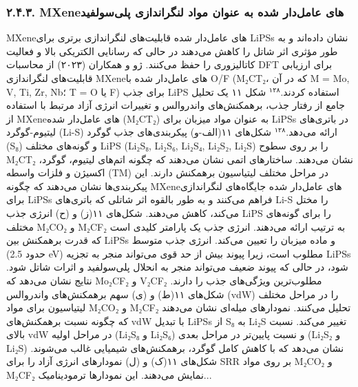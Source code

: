 \documentclass[12pt,a4paper,twocolumn]{article} %
\newcommand{\persian}[1]{\textfarsi{#1}}
\newcommand{\english}[1]{\textenglish{#1}}
\begin{document}
\subsubsection*{\persian{۲.۴.۳. \english{MXene}های عامل‌دار شده به عنوان مواد لنگراندازی پلی‌سولفید}}
\persian{
\english{MXene}های عامل‌دار شده قابلیت‌های لنگراندازی برتری برای \english{LiPSs} نشان داده‌اند و به طور مؤثری اثر شاتل را کاهش می‌دهند در حالی که رسانایی الکتریکی بالا و فعالیت کاتالیزوری را حفظ می‌کنند. ژو و همکاران (۲۰۲۳) از محاسبات \english{DFT} برای ارزیابی قابلیت‌های لنگراندازی \english{MXene}های عامل‌دار شده با \english{O/F} (\english{M₂CT₂}، که در آن \english{M = Mo, V, Ti, Zr, Nb}؛ \english{T = O} یا \english{F}) برای جذب \english{LiPS} استفاده کردند.$^{۱۲۸}$ شکل ۱۱ یک تحلیل جامع از رفتار جذب، برهمکنش‌های واندروالس و تغییرات انرژی آزاد مرتبط با استفاده از \english{MXene}های عامل‌دار شده (\english{M₂CT₂}) به عنوان مواد میزبان برای \english{LiPSs} در باتری‌های لیتیوم-گوگرد (\english{Li-S}) ارائه می‌دهد.$^{۱۲۸}$ شکل‌های ۱۱(الف-و) پیکربندی‌های جذب گوگرد (\english{S₈}) و گونه‌های مختلف \english{LiPS} (\english{Li₂S₈, Li₂S₆, Li₂S₄, Li₂S₂, Li₂S}) را بر روی سطوح \english{M₂CT₂} نشان می‌دهند. ساختارهای اتمی نشان می‌دهند که چگونه اتم‌های لیتیوم، گوگرد، اکسیژن و فلزات واسطه (\english{TM}) در مراحل مختلف لیتیاسیون برهمکنش دارند. این پیکربندی‌ها نشان می‌دهند که چگونه \english{MXene}های عامل‌دار شده جایگاه‌های لنگراندازی برای \english{LiPSs} فراهم می‌کنند و به طور بالقوه اثر شاتلی که باتری‌های \english{Li-S} را مختل می‌کند، کاهش می‌دهند. شکل‌های ۱۱(ز) و (ح) انرژی جذب \english{LiPS} را برای گونه‌های مختلف \english{M₂CO₂} و \english{M₂CF₂} به ترتیب ارائه می‌دهند. انرژی جذب یک پارامتر کلیدی است که قدرت برهمکنش بین \english{LiPSs} و ماده میزبان را تعیین می‌کند. انرژی جذب متوسط (حدود \english{2.5 eV}) مطلوب است، زیرا پیوند بیش از حد قوی می‌تواند منجر به تجزیه \english{LiPSs} شود، در حالی که پیوند ضعیف می‌تواند منجر به انحلال پلی‌سولفید و اثرات شاتل شود. نتایج نشان می‌دهد که \english{Mo₂CF₂} و \english{V₂CF₂} مطلوب‌ترین ویژگی‌های جذب را دارند. شکل‌های ۱۱(ط) و (ی) سهم برهمکنش‌های واندروالس (\english{vdW}) را در مراحل مختلف لیتیاسیون برای مواد \english{M₂CO₂} و \english{M₂CF₂} تحلیل می‌کنند. نمودارهای میله‌ای نشان می‌دهند که چگونه نسبت برهمکنش‌های \english{vdW} با تبدیل \english{LiPSs} از \english{S₈} به \english{Li₂S} تغییر می‌کند. نسبت بالای \english{vdW} در مراحل اولیه (\english{Li₂S₈} و \english{Li₂S₆}) و نسبت پایین‌تر در مراحل بعدی (\english{Li₂S₂} و \english{Li₂S}) نشان می‌دهد که با کاهش کامل گوگرد، برهمکنش‌های شیمیایی غالب می‌شوند. شکل‌های ۱۱(ک) و (ل) نمودارهای انرژی آزاد را برای \english{SRR} بر روی مواد \english{M₂CO₂} و \english{M₂CF₂} نمایش می‌دهند. این نمودارها ترمودینامیک...
}
\end{document}
